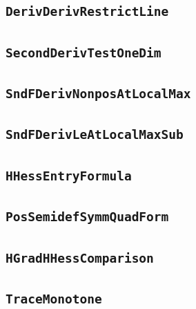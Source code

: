 \documentclass[11pt]{amsart}
\theoremstyle{definition}
\begin{document}
\subsection{\texorpdfstring{\texttt{DerivDerivRestrictLine}}{DerivDerivRestrictLine}}\label{node:DerivDerivRestrictLine}


\subsection{\texorpdfstring{\texttt{SecondDerivTestOneDim}}{SecondDerivTestOneDim}}\label{node:SecondDerivTestOneDim}


\subsection{\texorpdfstring{\texttt{SndFDerivNonposAtLocalMax}}{SndFDerivNonposAtLocalMax}}\label{node:SndFDerivNonposAtLocalMax}


\subsection{\texorpdfstring{\texttt{SndFDerivLeAtLocalMaxSub}}{SndFDerivLeAtLocalMaxSub}}\label{node:SndFDerivLeAtLocalMaxSub}


\subsection{\texorpdfstring{\texttt{HHessEntryFormula}}{HHessEntryFormula}}\label{node:HHessEntryFormula}


\subsection{\texorpdfstring{\texttt{PosSemidefSymmQuadForm}}{PosSemidefSymmQuadForm}}\label{node:PosSemidefSymmQuadForm}


\subsection{\texorpdfstring{\texttt{HGradHHessComparison}}{HGradHHessComparison}}\label{node:HGradHHessComparison}


\subsection{\texorpdfstring{\texttt{TraceMonotone}}{TraceMonotone}}\label{node:TraceMonotone}

\end{document}

